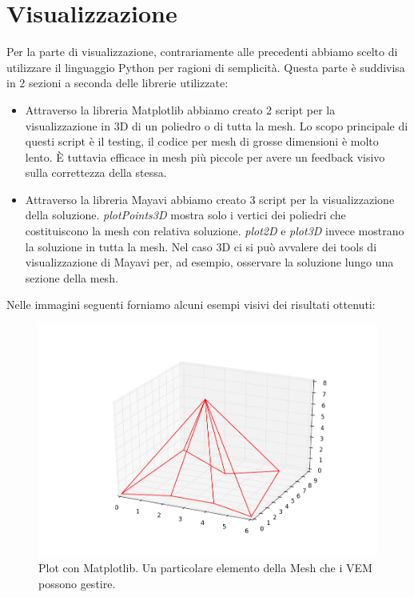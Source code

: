\documentclass[oneside,12pt]{book}  %
\theoremstyle{plain}
\theoremstyle{definition}
\theoremstyle{remark}
\numberwithin{equation}{chapter} %
\begin{document}
\section{Visualizzazione }
\label{sec:visualizzazione}
Per la parte di visualizzazione, contrariamente alle precedenti
abbiamo scelto di utilizzare il linguaggio Python per ragioni di
semplicit\`a. Questa parte \`e suddivisa in 2 sezioni a seconda delle
librerie utilizzate:
\begin{itemize}
\item
Attraverso la libreria Matplotlib abbiamo creato 2 script per la
visualizzazione in 3D di un poliedro o di tutta la mesh. Lo scopo
principale di questi script \`e il testing, il codice per mesh di
grosse dimensioni \`e molto lento. \`E tuttavia efficace in mesh
pi\`u piccole per avere un feedback visivo sulla correttezza della
stessa. 
\item
Attraverso la libreria Mayavi abbiamo creato 3 script per la
visualizzazione della soluzione. 
\textit{plotPoints3D} mostra solo i vertici dei poliedri che
costituiscono la mesh con relativa soluzione. 
\textit{plot2D} e \textit{plot3D} invece mostrano la soluzione in
tutta la mesh. Nel caso 3D ci si pu\`o avvalere dei tools di
visualizzazione di Mayavi per, ad esempio, osservare la soluzione
lungo una sezione della mesh.
\end{itemize}
Nelle immagini seguenti forniamo alcuni esempi visivi dei risultati ottenuti:

\begin{figure}[h]
\label{img:matplotlibPolyhedron}
\centering
\includegraphics[scale=0.4]{Immagini/Project/matplotlibTest5.png}
\caption{Plot con Matplotlib. Un particolare elemento della Mesh che i
  VEM possono gestire.}
\end{figure}
\end{document}
